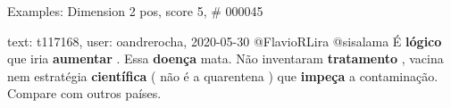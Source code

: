 \begin{frame}{Examples: Dimension 2 pos, score 5, \# 000045}
\footnotesize
\begin{exampleblock}{text: t117168, user: oandrerocha, 2020-05-30}
@FlavioRLira @sisalama É \textbf{lógico} que iria \textbf{aumentar} . Essa 
\textbf{doença} mata. Não inventaram \textbf{tratamento} , vacina nem 
estratégia \textbf{científica} ( não é a quarentena ) que \textbf{impeça} a 
contaminação. Compare com outros países. 
\end{exampleblock}
\end{frame}
